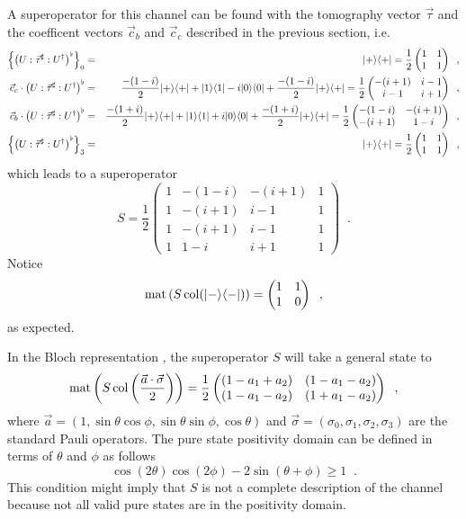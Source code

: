 A superoperator for this channel can be found with the tomography vector $\vec{\tau}$ and the coefficent vectors $\vec{c}_b$ and $\vec{c}_c$ described in the previous section, i.e.\
\begin{eqnarray*}
\left\{\left(U:\vec{\tau}^\sharp:U^\dagger\right)^\flat\right\}_0 &=& |+\rangle\langle+|=\frac{1}{2}\begin{pmatrix}
1&1\\
1&1
\end{pmatrix}\;\;,\\
\vec{c}_c\cdot\left(U:\vec{\tau}^\sharp:U^\dagger\right)^\flat &=& \frac{-(1-i)}{2}|+\rangle\langle+|+|1\rangle\langle1|-i|0\rangle\langle0|+\frac{-(1-i)}{2}|+\rangle\langle+|=\frac{1}{2}\begin{pmatrix}
-(i+1)&i-1\\
i-1&i+1
\end{pmatrix}\;\;,\\
\vec{c}_b\cdot\left(U:\vec{\tau}^\sharp:U^\dagger\right)^\flat &=& \frac{-(1+i)}{2}|+\rangle\langle+|+|1\rangle\langle1|+i|0\rangle\langle0|+\frac{-(1+i)}{2}|+\rangle\langle+|=\frac{1}{2}\begin{pmatrix}
-(1-i)&-(i+1)\\
-(i+1)&1-i
\end{pmatrix}\;\;,\\
\left\{\left(U:\vec{\tau}^\sharp:U^\dagger\right)^\flat\right\}_3 &=& |+\rangle\langle+|=\frac{1}{2}\begin{pmatrix}
1&1\\
1&1
\end{pmatrix}\;\;,\\
\end{eqnarray*}
which leads to a superoperator
$$
S = \frac{1}{2}\begin{pmatrix}
1&-(1-i)&-(i+1)&1\\
1&-(i+1)&i-1&1\\
1&-(i+1)&i-1&1\\
1&1-i&i+1&1
\end{pmatrix}\;\;.
$$
Notice
$$
\operatorname{mat}\left(S\operatorname{col}(|-\rangle\langle-|)\right) =\begin{pmatrix}
1&1\\
1&0
\end{pmatrix}\;\;,
$$
as expected.

In the Bloch representation \cite{Bloch1946,Nielsen2010}, the superoperator $S$ will take a general state to
$$
\operatorname{mat}\left(S\operatorname{col}\left(\frac{\vec{a}\cdot\vec{\sigma}}{2}\right)\right) = \frac{1}{2}\begin{pmatrix}
 (1-a_1+a_2) & (1-a_1-a_2) \\
 (1-a_1-a_2) & (1+a_1-a_2)
\end{pmatrix}\;\;,
$$
where $\vec{a} = (1,\sin\theta\cos\phi,\sin\theta\sin\phi,\cos\theta)$ and $\vec{\sigma}=(\sigma_0,\sigma_1,\sigma_2,\sigma_3)$ are the standard Pauli operators.  The pure state positivity domain can be defined in terms of $\theta$ and $\phi$ as follows
\begin{equation}
\label{eqn:cond1}
\cos\left(2 \theta\right) \cos\left(2 \phi\right)-2 \sin\left(\theta+\phi\right)\ge 1\;\;.
\end{equation}
This condition might imply that $S$ is not a complete description of the channel because not all valid pure states are in the positivity domain.

